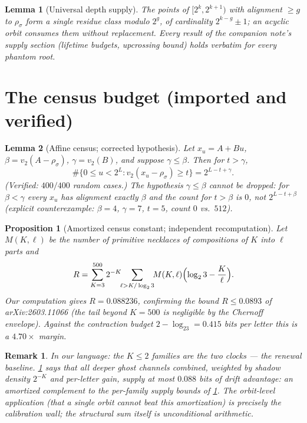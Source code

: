 \documentclass[11pt]{article}
\newtheorem{lemma}{Lemma}
\newtheorem{proposition}{Proposition}
\newtheorem*{remark}{Remark}
\newcommand{\vt}{v_2}
\begin{document}
\begin{lemma}[Universal depth supply]\label{lem:supply}
The points of $[2^k,2^{k+1})$ with alignment $\ge g$ to $\rho_\sigma$
form a single residue class modulo $2^g$, of cardinality
$2^{k-g}\pm1$; an acyclic orbit consumes them without replacement.
Every result of the companion note's supply section (lifetime budgets,
upcrossing bound) holds verbatim for every phantom root.
\end{lemma}

\section{The census budget (imported and verified)}

\begin{lemma}[Affine census; corrected hypothesis]\label{lem:census}
Let $x_u=A+Bu$, $\beta=\vt(A-\rho_\sigma)$, $\gamma=\vt(B)$, and
suppose $\gamma\le\beta$. Then for $t>\gamma$,
\[
\#\{0\le u<2^L:\vt(x_u-\rho_\sigma)\ge t\}=2^{L-t+\gamma}.
\]
(Verified: $400/400$ random cases.) The hypothesis $\gamma\le\beta$
cannot be dropped: for $\beta<\gamma$ every $x_u$ has alignment
exactly $\beta$ and the count for $t>\beta$ is $0$, not
$2^{L-t+\beta}$ (explicit counterexample: $\beta=4$, $\gamma=7$,
$t=5$, count $0$ vs.\ $512$).
\end{lemma}

\begin{proposition}[Amortized census constant; independent
recomputation]\label{prop:R}
Let $M(K,\ell)$ be the number of primitive necklaces of compositions
of $K$ into $\ell$ parts and
\[
R=\sum_{K=3}^{500}2^{-K}\!\!\sum_{\ell>K/\log_23}\!\!
M(K,\ell)\Bigl(\log_23-\frac K\ell\Bigr).
\]
Our computation gives $R=0.088236$, confirming the bound $R\le0.0893$
of arXiv:2603.11066 (the tail beyond $K=500$ is negligible by the
Chernoff envelope). Against the contraction budget
$2-\log_23=0.415$ bits per letter this is a $4.70\times$ margin.
\end{proposition}

\begin{remark}
In our language: the $K\le2$ families \emph{are} the two clocks ---
the renewal baseline. \cref{prop:R} says that all deeper ghost
channels combined, weighted by shadow density $2^{-K}$ and per-letter
gain, supply at most $0.088$ bits of drift advantage: an
\emph{amortized} complement to the per-family supply bounds of
\cref{lem:supply}. The orbit-level application (that a single orbit
cannot beat this amortization) is precisely the calibration wall; the
structural sum itself is unconditional arithmetic.
\end{remark}
\end{document}
